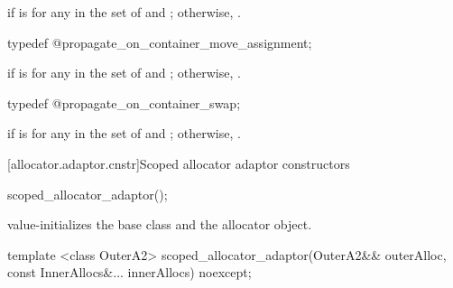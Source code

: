 \begin{itemdescr}
\pnum
\ctype {} if
 is
 for any  in the set of  and
; otherwise, .
\end{itemdescr}

%
%
\begin{itemdecl}
typedef @\seebelow@ propagate_on_container_move_assignment;
\end{itemdecl}

\begin{itemdescr}
\pnum
\ctype {} if
 is
 for any  in the set of  and
; otherwise, .
\end{itemdescr}

%
%
\begin{itemdecl}
typedef @\seebelow@ propagate_on_container_swap;
\end{itemdecl}

\begin{itemdescr}
\pnum
\ctype {} if
 is
 for any  in the set of  and
; otherwise, .
\end{itemdescr}

[allocator.adaptor.cnstr]{Scoped allocator adaptor constructors}

%
\begin{itemdecl}
scoped_allocator_adaptor();
\end{itemdecl}

\begin{itemdescr}
\pnum
\effects value-initializes the  base class and the  allocator
object.
\end{itemdescr}

%
\begin{itemdecl}
template <class OuterA2>
  scoped_allocator_adaptor(OuterA2&& outerAlloc,
                           const InnerAllocs&... innerAllocs) noexcept;
\end{itemdecl}

